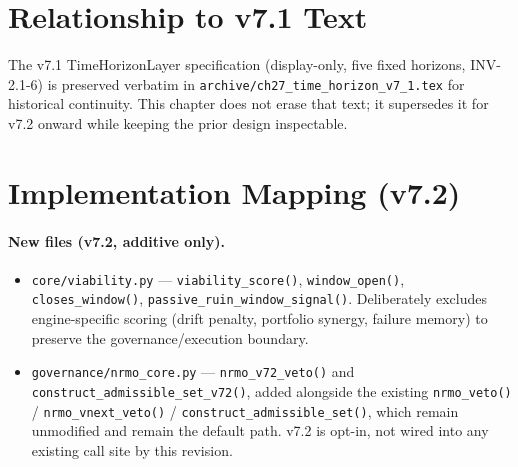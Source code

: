 \section{Relationship to v7.1 Text}
\label{sec:time-horizon-v71-relationship}

The v7.1 TimeHorizonLayer specification (display-only, five fixed
horizons, INV-2.1-6) is preserved verbatim in
\texttt{archive/ch27\_time\_horizon\_v7\_1.tex} for historical
continuity. This chapter does not erase that text; it supersedes it
for v7.2 onward while keeping the prior design inspectable.


\section{Implementation Mapping (v7.2)}
\label{sec:time-horizon-implementation-mapping}


\paragraph{New files (v7.2, additive only).}
\begin{itemize}
\item \texttt{core/viability.py} — \texttt{viability\_score()},
\texttt{window\_open()}, \texttt{closes\_window()},
\texttt{passive\_ruin\allowbreak\_window\allowbreak\_signal()}. Deliberately excludes
engine-specific scoring (drift penalty, portfolio synergy, failure
memory) to preserve the governance/execution boundary.
\item \texttt{governance/nrmo\_core.py} — \texttt{nrmo\_v72\_veto()}
and \texttt{construct\_admissible\_set\_v72()}, added alongside the
existing \texttt{nrmo\_veto()} / \texttt{nrmo\_vnext\_veto()} /
\texttt{construct\_admissible\_set()}, which remain unmodified and
remain the default path. v7.2 is opt-in, not wired into any existing
call site by this revision.
\end{itemize}

